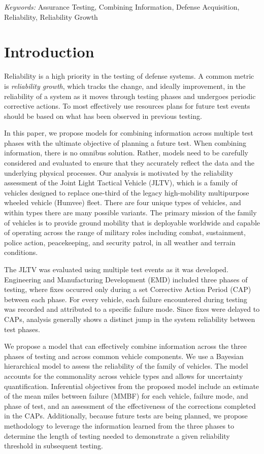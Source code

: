 \documentclass[12pt]{article}
\begin{document}
\noindent%
{\it Keywords:}  Assurance Testing, Combining Information, Defense Acquisition, Reliability, Reliability Growth
\vfill

\newpage
\doublespacing
\section{Introduction}
Reliability is a high priority in the testing of defense systems. A common
metric is {\em reliability growth}, which tracks the change, and ideally
improvement, in the reliability of a system as it moves through testing phases
and undergoes periodic corrective actions. To most effectively use resources
plans for future test events should be based on what has been observed in
previous testing.

In this paper, we propose models for combining information across multiple test phases with
the ultimate objective of planning a future test. When combining information, there is no
omnibus solution. Rather, models need to be carefully considered and evaluated
to ensure that they accurately reflect the data and the underlying physical
processes. Our analysis is motivated by the reliability assessment of the Joint Light
Tactical Vehicle (JLTV), which is a family of vehicles designed to replace
one-third of the legacy high-mobility multipurpose wheeled vehicle (Humvee)
fleet. There are four unique types of vehicles, and within types there are many
possible variants. The primary mission of the family of vehicles is to provide
ground mobility that is deployable worldwide and capable of operating across the
range of military roles including combat, sustainment, police action,
peacekeeping, and security patrol, in all weather and terrain conditions.

The JLTV was evaluated using multiple test events as it was developed.
Engineering and Manufacturing Development (EMD) included three phases of
testing, where fixes occurred only during a set Corrective Action Period (CAP)
between each phase. For every vehicle, each failure encountered during testing
was recorded and attributed to a specific failure mode.  Since fixes were
delayed to CAPs, analysis generally shows a distinct jump in the system
reliability between test phases.

We propose a model that can effectively combine information across the three
phases of testing and across common vehicle components. We use a Bayesian
hierarchical model to assess the reliability of the family of vehicles. The
model accounts for the commonality across vehicle types and allows for
uncertainty quantification. Inferential objectives from the proposed model
include an estimate of the mean miles between failure (MMBF) for each vehicle,
failure mode, and phase of test, and an assessment of the effectiveness of the
corrections completed in the CAPs. Additionally, because future tests are being
planned, we propose methodology to leverage the information learned from the
three phases to determine the length of testing needed to demonstrate a given
reliability threshold in subsequent testing.
\end{document}
